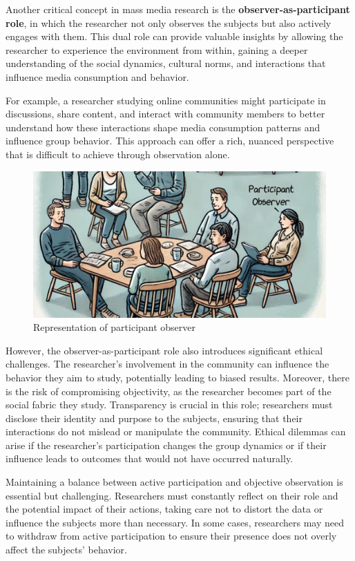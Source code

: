 \documentclass[
]{book}
\begin{document}
Another critical concept in mass media research is the \textbf{observer-as-participant role}, in which the researcher not only observes the subjects but also actively engages with them. This dual role can provide valuable insights by allowing the researcher to experience the environment from within, gaining a deeper understanding of the social dynamics, cultural norms, and interactions that influence media consumption and behavior.

For example, a researcher studying online communities might participate in discussions, share content, and interact with community members to better understand how these interactions shape media consumption patterns and influence group behavior. This approach can offer a rich, nuanced perspective that is difficult to achieve through observation alone.

\begin{figure}
\centering
\includegraphics{images/fig01f.jpg}
\caption{Representation of participant observer}
\end{figure}

However, the observer-as-participant role also introduces significant ethical challenges. The researcher's involvement in the community can influence the behavior they aim to study, potentially leading to biased results. Moreover, there is the risk of compromising objectivity, as the researcher becomes part of the social fabric they study. Transparency is crucial in this role; researchers must disclose their identity and purpose to the subjects, ensuring that their interactions do not mislead or manipulate the community. Ethical dilemmas can arise if the researcher's participation changes the group dynamics or if their influence leads to outcomes that would not have occurred naturally.

Maintaining a balance between active participation and objective observation is essential but challenging. Researchers must constantly reflect on their role and the potential impact of their actions, taking care not to distort the data or influence the subjects more than necessary. In some cases, researchers may need to withdraw from active participation to ensure their presence does not overly affect the subjects' behavior.
\end{document}
